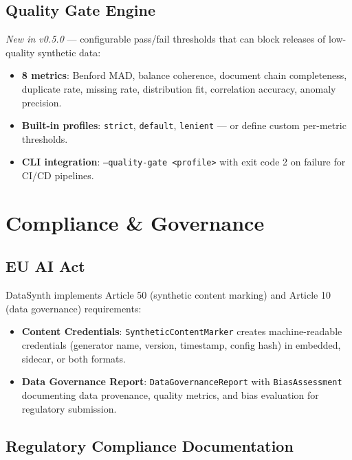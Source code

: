 \documentclass[11pt,a4paper]{article}
\begin{document}
\subsection{Quality Gate Engine}

\textit{New in v0.5.0} --- configurable pass/fail thresholds that can block
releases of low-quality synthetic data:

\begin{itemize}[leftmargin=1.4em, itemsep=2pt]
  \item \textbf{8 metrics}: Benford MAD, balance coherence, document chain
        completeness, duplicate rate, missing rate, distribution fit,
        correlation accuracy, anomaly precision.
  \item \textbf{Built-in profiles}: \texttt{strict}, \texttt{default},
        \texttt{lenient} --- or define custom per-metric thresholds.
  \item \textbf{CLI integration}: \texttt{--quality-gate <profile>} with
        exit code 2 on failure for CI/CD pipelines.
\end{itemize}

\section{Compliance \& Governance}

\subsection{EU AI Act}

DataSynth implements Article 50 (synthetic content marking) and Article 10
(data governance) requirements:

\begin{itemize}[leftmargin=1.4em, itemsep=2pt]
  \item \textbf{Content Credentials}: \texttt{SyntheticContentMarker} creates
        machine-readable credentials (generator name, version, timestamp,
        config hash) in embedded, sidecar, or both formats.
  \item \textbf{Data Governance Report}: \texttt{DataGovernanceReport} with
        \texttt{BiasAssessment} documenting data provenance, quality metrics,
        and bias evaluation for regulatory submission.
\end{itemize}

\subsection{Regulatory Compliance Documentation}
\end{document}
